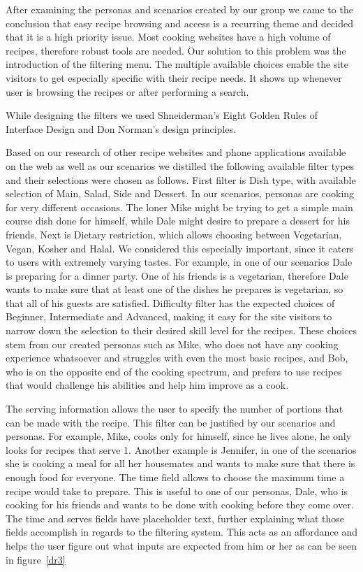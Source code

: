 After examining the personas and scenarios created by our group we came to the conclusion that easy recipe browsing and access is a recurring theme and decided that it is a high priority issue. Most cooking websites have a high volume of recipes, therefore robust tools are needed. Our solution to this problem was the introduction of the filtering menu. The multiple available choices enable the site visitors to get especially specific with their recipe needs. It shows up whenever user is browsing the recipes or after performing a search.

While designing the filters we used Shneiderman’s Eight Golden Rules of Interface Design and Don Norman’s design principles.

Based on our research of other recipe websites and phone applications available on the web as well as our scenarios we distilled the following available filter types and their selections were chosen as follows. First filter is Dish type, with available selection of Main, Salad, Side and Dessert. In our scenarios, personas are cooking for very different occasions. The loner Mike might be trying to get a simple main course dish done for himself, while Dale might desire to prepare a dessert for his friends.  Next is Dietary restriction, which allows choosing between Vegetarian, Vegan, Kosher and Halal. We considered this especially important, since it caters to users with extremely varying tastes. For example, in one of our scenarios Dale is preparing for a dinner party. One of his friends is a vegetarian, therefore Dale wants to make sure that at least one of the dishes he prepares is vegetarian, so that all of his guests are satisfied. Difficulty filter has the expected choices of Beginner, Intermediate and Advanced, making it easy for the site visitors to narrow down the selection to their desired skill level for the recipes. These choices stem from our created personas such as Mike, who does not have any cooking experience whatsoever and struggles with even the most basic recipes, and Bob, who is on the opposite end of the cooking spectrum, and prefers to use recipes that would challenge his abilities and help him improve as a cook.  

The serving information allows the user to specify the number of
portions that can be made with the recipe. This filter can be
justified by our scenarios and personas. For example, Mike, cooks only
for himself, since he lives alone, he only looks for recipes that
serve 1. Another example is Jennifer, in one of the scenarios she is cooking a meal for all her housemates and wants to make sure that there is enough food for everyone. The time field allows to choose the maximum time a recipe would take to prepare. This is useful to one of our personas, Dale, who is cooking for his friends and wants to be done with cooking before they come over. The time and serves fields have placeholder text, further explaining what those fields accomplish in regards to the filtering system. This acts as an affordance and helps the user figure out what inputs are expected from him or her as can be seen in figure~\ref{dr3}

